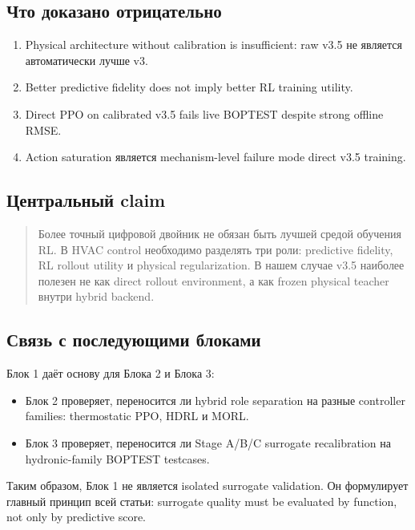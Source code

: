 \documentclass[12pt,a4paper]{article}
\begin{document}
\subsection{Что доказано отрицательно}

\begin{enumerate}
    \item Physical architecture without calibration is insufficient: raw v3.5 не является автоматически лучше v3.
    \item Better predictive fidelity does not imply better RL training utility.
    \item Direct PPO on calibrated v3.5 fails live BOPTEST despite strong offline RMSE.
    \item Action saturation является mechanism-level failure mode direct v3.5 training.
\end{enumerate}

\subsection{Центральный claim}

\begin{quote}
Более точный цифровой двойник не обязан быть лучшей средой обучения RL. В HVAC control необходимо разделять три роли: predictive fidelity, RL rollout utility и physical regularization. В нашем случае v3.5 наиболее полезен не как direct rollout environment, а как frozen physical teacher внутри hybrid backend.
\end{quote}

\subsection{Связь с последующими блоками}

Блок 1 даёт основу для Блока 2 и Блока 3:

\begin{itemize}
    \item Блок 2 проверяет, переносится ли hybrid role separation на разные controller families: thermostatic PPO, HDRL и MORL.
    \item Блок 3 проверяет, переносится ли Stage A/B/C surrogate recalibration на hydronic-family BOPTEST testcases.
\end{itemize}

Таким образом, Блок 1 не является isolated surrogate validation. Он формулирует главный принцип всей статьи: surrogate quality must be evaluated by function, not only by predictive score.
\end{document}
